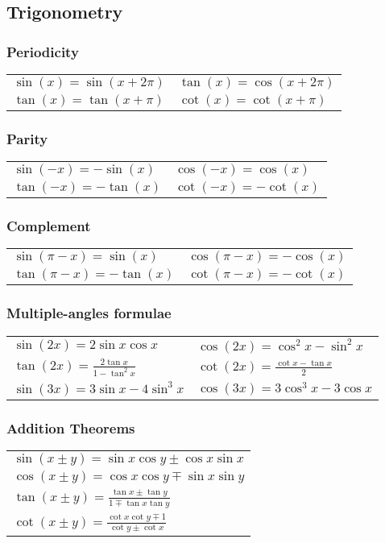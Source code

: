 \documentclass[a4paper, 10pt]{article}
\theoremstyle{definition}
\theoremstyle{named}
\begin{document}
\subsection*{Trigonometry}

\subsubsection*{Periodicity}
\begin{tabularx}{\linewidth}{XX}
    $\sin(x) = \sin(x + 2 \pi)$ & $\tan(x) = \cos(x + 2\pi)$ \\
    $\tan(x) = \tan(x + \pi)$ & $\cot(x) = \cot(x + \pi)$
\end{tabularx}

\subsubsection*{Parity}
\begin{tabularx}{\linewidth}{XX}
    $\sin(-x) = - \sin(x)$ & $\cos(-x) = \cos(x)$ \\
    $\tan(-x) = - \tan(x)$ & $\cot(-x) = -\cot(x)$
\end{tabularx}

\subsubsection*{Complement}
\begin{tabularx}{\linewidth}{XX}
    $\sin(\pi - x) = \sin(x)$ & $\cos(\pi - x) = -\cos(x)$ \\
    $\tan(\pi - x) = - \tan(x)$ & $\cot(\pi - x) = -\cot(x)$
\end{tabularx}

\subsubsection*{Multiple-angles formulae}
\begin{tabularx}{\linewidth}{XX}
    $\sin(2x) = 2 \sin x \cos x $ & $\cos(2x) = \cos^2x - \sin^2x$ \\
    $\tan(2x) = \frac{2 \tan x}{1 - \tan^2x}$ & $\cot(2x) = \frac{\cot x - \tan x}{2}$ \\
    $\sin(3x) = 3 \sin x - 4 \sin^3 x$ & $\cos(3x) = 3 \cos^3 x - 3 \cos x$
\end{tabularx}

\subsubsection*{Addition Theorems}
\begin{tabularx}{\linewidth}{X}
    $\sin(x \pm y) = \sin x \cos y \pm \cos x \sin x$ \\
    $\cos(x \pm y) = \cos x \cos y \mp \sin x \sin y$ \\
    $\tan(x \pm y) = \frac{\tan x \pm \tan y}{1 \mp \tan x \tan y}$ \\
    $\cot(x \pm y) = \frac{\cot x \cot y \mp 1}{\cot y \pm \cot x}$
\end{tabularx}
\end{document}
